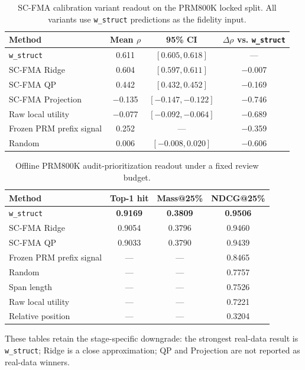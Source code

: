 \documentclass[a4paper,fleqn]{cas-sc}
\begin{document}
\begin{table}[ht]
\caption{SC-FMA calibration variant readout on the PRM800K locked split. All variants use \texttt{w\_struct} predictions as the fidelity input.}
\label{tab:supp-scfma-variants}
\centering
\small
\begin{tabular}{lccc}
\toprule
\textbf{Method} & \textbf{Mean $\rho$} & \textbf{95\% CI} & \textbf{$\Delta\rho$ vs. \texttt{w\_struct}} \\
\midrule
\texttt{w\_struct} & 0.611 & $[0.605,0.618]$ & --- \\
SC-FMA Ridge & 0.604 & $[0.597,0.611]$ & $-$0.007 \\
SC-FMA QP & 0.442 & $[0.432,0.452]$ & $-$0.169 \\
SC-FMA Projection & $-$0.135 & $[-0.147,-0.122]$ & $-$0.746 \\
Raw local utility & $-$0.077 & $[-0.092,-0.064]$ & $-$0.689 \\
Frozen PRM prefix signal & 0.252 & --- & $-$0.359 \\
Random & 0.006 & $[-0.008,0.020]$ & $-$0.606 \\
\bottomrule
\end{tabular}
\end{table}

\begin{table}[ht]
\caption{Offline PRM800K audit-prioritization readout under a fixed review budget.}
\label{tab:supp-audit-prioritization}
\centering
\small
\begin{tabular}{lccc}
\toprule
\textbf{Method} & \textbf{Top-1 hit} & \textbf{Mass@25\%} & \textbf{NDCG@25\%} \\
\midrule
\texttt{w\_struct} & \textbf{0.9169} & \textbf{0.3809} & \textbf{0.9506} \\
SC-FMA Ridge & 0.9054 & 0.3796 & 0.9460 \\
SC-FMA QP & 0.9033 & 0.3790 & 0.9439 \\
Frozen PRM prefix signal & --- & --- & 0.8465 \\
Random & --- & --- & 0.7757 \\
Span length & --- & --- & 0.7526 \\
Raw local utility & --- & --- & 0.7221 \\
Relative position & --- & --- & 0.3204 \\
\bottomrule
\end{tabular}
\end{table}

These tables retain the stage-specific downgrade: the strongest real-data result is \texttt{w\_struct}; Ridge is a close approximation; QP and Projection are not reported as real-data winners.
\end{document}
